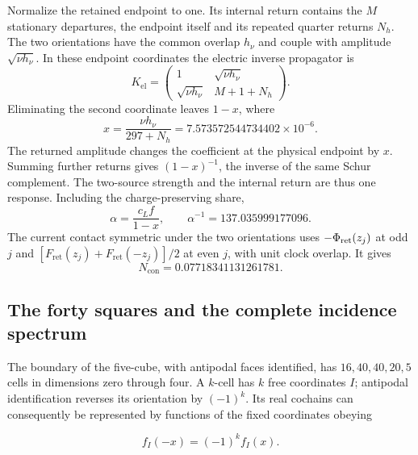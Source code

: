 \documentclass[aps,prx,onecolumn,10pt,notitlepage,nofootinbib,longbibliography]{revtex4-2}
\numberwithin{equation}{section}
\numberwithin{table}{section}
\newcommand{\Fret}{F_{\mathrm{ret}}}
\newcommand{\hover}{h_\nu}
\newcommand{\Phis}{\Phi_{\rm ret}}
\begin{document}
Normalize the retained endpoint to one. Its internal return contains the $M$ stationary departures, the endpoint itself and its repeated quarter returns $N_h$. The two orientations have the common overlap $\hover$ and couple with amplitude $\sqrt{\nu\hover}$. In these endpoint coordinates the electric inverse propagator is
\begin{equation}
 K_{\mathrm{el}}=
 \begin{pmatrix}1&\sqrt{\nu\hover}\\\sqrt{\nu\hover}&M+1+N_h\end{pmatrix}.
 \label{eq:electricblock}
\end{equation}
Eliminating the second coordinate leaves $1-x$, where
\begin{equation}
 x=\frac{\nu\hover}{297+N_h}=7.573572544734402\times10^{-6}.
\end{equation}
The returned amplitude changes the coefficient at the physical endpoint by $x$. Summing further returns gives $(1-x)^{-1}$, the inverse of the same Schur complement. The two-source strength and the internal return are thus one response. Including the charge-preserving share,
\begin{equation}
 \alpha=\frac{c_Lf}{1-x},\qquad
 \alpha^{-1}=137.035999177096.
 \label{eq:alpha}
\end{equation}
The current contact symmetric under the two orientations uses $-\Phis(z_j)$ at odd $j$ and $[\Fret(z_j)+\Fret(-z_j)]/2$ at even $j$, with unit clock overlap. It gives
\begin{equation}
 N_{\mathrm{con}}=0.07718341131261781.
 \label{eq:Ncon}
\end{equation}

\subsection{The forty squares and the complete incidence spectrum}\label{the-forty-squares-and-the-complete-incidence-spectrum}

The boundary of the five-cube, with antipodal faces identified, has \(16,40,40,20,5\) cells in dimensions zero through four. A \(k\)-cell has \(k\) free coordinates \(I\); antipodal identification reverses its orientation by \((-1)^k\). Its real cochains can consequently be represented by functions of the fixed coordinates obeying

\begin{equation}
 f_I(-x)=(-1)^k f_I(x).
 \label{eq:proof-SD-1}
\end{equation}
\end{document}
